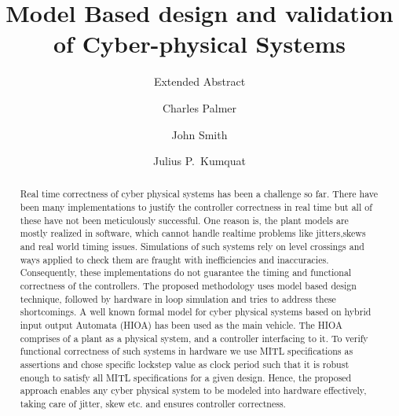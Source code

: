 \documentclass[sigconf]{acmart}
\begin{document}
\title{Model Based design and validation of Cyber-physical Systems}
\subtitle{Extended Abstract}

\author{Charles Palmer}

\author{John Smith}

\author{Julius P.~Kumquat}



\begin{abstract}
Real time correctness of cyber physical systems has been a challenge so far. There have been many implementations to justify the controller correctness in real time but all of these have not been meticulously successful. One reason is, the plant models are mostly realized in software, which cannot handle realtime problems like jitters,skews and real world timing issues. Simulations of such systems rely on level crossings and ways applied to check them are fraught with inefficiencies and inaccuracies. Consequently, these implementations do not guarantee the timing and functional correctness of the controllers. The proposed methodology uses model based design technique, followed by hardware in loop simulation and tries to address these shortcomings. A well known formal model for cyber physical systems based on hybrid input output Automata (HIOA) has been used as the main vehicle. The HIOA comprises of a plant as a physical system, and a controller interfacing to it. To verify functional correctness of such systems in hardware we use MITL specifications as assertions and chose specific lockstep value as clock period such that it is robust enough to satisfy all MITL specifications for a given design. Hence, the proposed approach enables any cyber physical system to be modeled into hardware effectively, taking care of jitter, skew etc. and ensures controller correctness.
\end{abstract}
\end{document}
